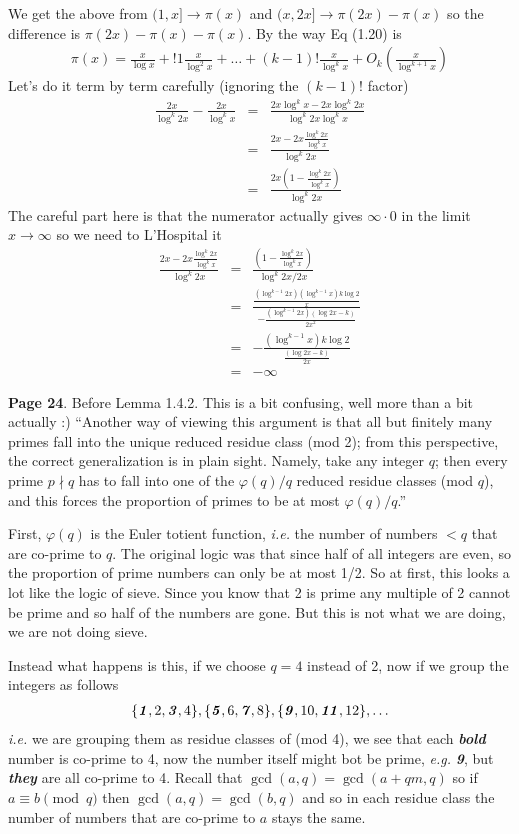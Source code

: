 \documentclass[aps,preprint,preprintnumbers,nofootinbib,showpacs,prd]{revtex4-1}
\newcommand{\ie}{{\it i.e.} }
\newcommand{\eg}{{\it e.g.} }
\newcommand{\nbea}{\begin{eqnarray*}}
\newcommand{\neea}{\end{eqnarray*}}
\begin{document}
We get the above from $(1,x] \to \pi(x)$ and $(x,2x] \to \pi(2x) - \pi(x)$ so the difference is $\pi(2x) - \pi(x) - \pi(x)$. By the way Eq (1.20) is
%
\nbea
\pi(x) = \frac{x}{\log x} + !1\frac{x}{\log^2 x} + \dots + (k-1)!\frac{x}{\log^k x} + O_k \left (\frac{x}{\log^{k+1} x} \right )
\neea
%
Let's do it term by term carefully (ignoring the $(k-1)!$ factor)
%
\nbea
\frac{2x}{\log^k 2x} - \frac{2x}{\log^k x} & = & \frac{2x \log^k x - 2x\log^k 2x}{\log^k 2x \log^k x} \\
& = & \frac{2x - 2x\frac{\log^k 2x}{\log^k x}}{\log^k 2x} \\
& = & \frac{2x \left(1 - \frac{\log^k 2x}{\log^k x}\right)}{\log^k 2x}
\neea
%
The careful part here is that the numerator actually gives $\infty\cdot0$ in the limit $x\to\infty$ so we need to L'Hospital it
%
\nbea
\frac{2x - 2x\frac{\log^k 2x}{\log^k x}}{\log^k 2x} & = & \frac{\left(1 - \frac{\log^k 2x}{\log^k x} \right )}{\log^k 2x/2x} \\
& = & \frac{\frac{(\log^{k-1} 2x) (\log^{k-1} x) k \log 2}{x}}{-\frac{(\log^{k-1} 2x)(\log 2x - k)}{2x^2}} \\
& = & -\frac{ (\log^{k-1} x) k \log 2}{\frac{(\log 2x - k)}{2x}} \\
& = & -\infty
\neea
%

{\bf Page 24}. Before Lemma 1.4.2. This is a bit confusing, well more than a bit actually :) ``Another way of viewing this argument is that all but finitely many primes fall into the unique reduced residue class (mod 2); from this perspective, the correct generalization is in plain sight. Namely, take any integer $q$; then every prime $p \nmid q$ has to fall into one of the $\varphi(q)/q$ reduced residue classes (mod $q$), and this forces the proportion of primes to be at most $\varphi(q)/q$.''

First, $\varphi(q)$ is the Euler totient function, \ie the number of numbers $< q$ that are co-prime to $q$. The original logic was that since half of all integers are even, so the proportion of prime numbers can only be at most 1/2. So at first, this looks a lot like the logic of sieve. Since you know that 2 is prime any multiple of 2 cannot be prime and so half of the numbers are gone. But this is not what we are doing, we are not doing sieve.

Instead what happens is this, if we choose $q=4$ instead of 2, now if we group the integers as follows
%
\nbea
\{\textbf{\textit 1},2,\textbf{\textit 3},4\},\{\textbf{\textit 5},6,\textbf{\textit {7}},8\},\{\textbf{\textit 9},10,\textbf{\textit {11}},12\}, \dots
\neea
%
\ie we are grouping them as residue classes of (mod 4), we see that each \textbf{\textit{bold}} number is co-prime to 4, now the number itself might bot be prime, \eg \textbf{\textit{9}}, but \textbf{\textit{they}} are all co-prime to 4. Recall that $\gcd(a, q) = \gcd(a + qm, q)$ so if $a \equiv b \pmod{q}$ then $\gcd(a,q) = \gcd(b,q)$ and so in each residue class the number of numbers that are co-prime to $a$ stays the same.
\end{document}
